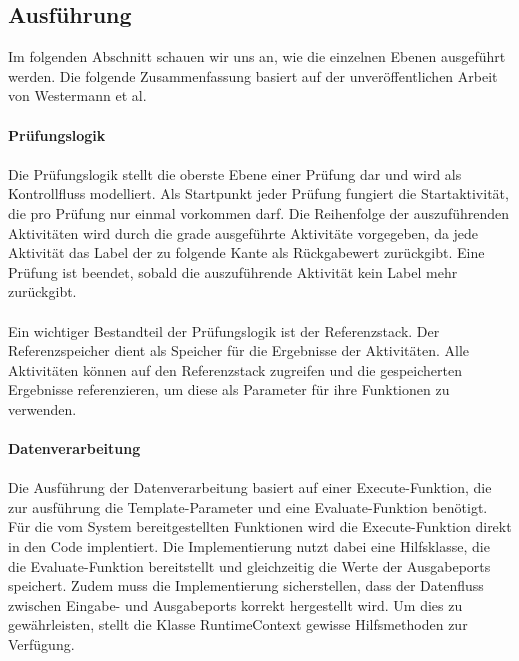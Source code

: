 \documentclass{article}
\begin{document}
    \subsection{Ausführung}
    Im folgenden Abschnitt schauen wir uns an, wie die einzelnen Ebenen ausgeführt werden.
    Die folgende Zusammenfassung basiert auf der unveröffentlichen Arbeit von Westermann et al.\\
    \\
    \textbf{Prüfungslogik}\\
    \\
    Die Prüfungslogik stellt die oberste Ebene einer Prüfung dar und wird als Kontrollfluss modelliert.
    Als Startpunkt jeder Prüfung fungiert die Startaktivität, die pro Prüfung nur einmal vorkommen darf.
    Die Reihenfolge der auszuführenden Aktivitäten wird durch die grade ausgeführte Aktivitäte vorgegeben, da jede Aktivität das Label der zu folgende Kante als Rückgabewert zurückgibt.
    Eine Prüfung ist beendet, sobald die auszuführende Aktivität kein Label mehr zurückgibt.\\
    \\
    Ein wichtiger Bestandteil der Prüfungslogik ist der Referenzstack. Der Referenzspeicher dient als Speicher für die Ergebnisse der Aktivitäten.
    Alle Aktivitäten können auf den Referenzstack zugreifen und die gespeicherten Ergebnisse referenzieren, um diese als Parameter für ihre Funktionen zu verwenden.\\
    \\
    \textbf{Datenverarbeitung}\\
    \\
    Die Ausführung der Datenverarbeitung basiert auf einer Execute-Funktion, die zur ausführung die Template-Parameter und eine Evaluate-Funktion benötigt.
    Für die vom System bereitgestellten Funktionen wird die Execute-Funktion direkt in den Code implentiert. 
    Die Implementierung nutzt dabei eine Hilfsklasse, die die Evaluate-Funktion bereitstellt und gleichzeitig die Werte der Ausgabeports speichert.
    Zudem muss die Implementierung sicherstellen, dass der Datenfluss zwischen Eingabe- und Ausgabeports korrekt hergestellt wird. 
    Um dies zu gewährleisten, stellt die Klasse RuntimeContext gewisse Hilfsmethoden zur Verfügung.
    
\end{document}
